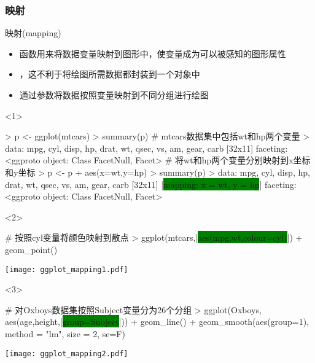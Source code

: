 \subsubsection{映射}
\begin{frame}[t,fragile]{\subsecname}{映射(mapping)}
\begin{itemize}
\item<1-> 函数用来将数据变量映射到图形中，使变量成为可以被感知的图形属性
\item<1-> ，这不利于将绘图所需数据都封装到一个对象中
\item<3-> 通过参数将数据按照变量映射到不同分组进行绘图
\end{itemize}

\begin{overlayarea}{\textwidth}{\textheight}
\begin{onlyenv}<1>
\begin{rcode}
> p <- ggplot(mtcars)
> summary(p)
# mtcars数据集中包括wt和hp两个变量
> data: mpg, cyl, disp, hp, drat, wt, qsec, vs, am, gear, carb [32x11]
  faceting: <ggproto object: Class FacetNull, Facet>
# 将wt和hp两个变量分别映射到x坐标和y坐标
> p <- p + aes(x=wt,y=hp)
> summary(p)
> data: mpg, cyl, disp, hp, drat, wt, qsec, vs, am, gear, carb [32x11]
  |\colorbox{green}{mapping:  x = wt, y = hp}|
  faceting: <ggproto object: Class FacetNull, Facet>
\end{rcode}
\end{onlyenv}

\begin{onlyenv}<2>
\begin{minipage}{\textwidth}
\begin{rcode}
# 按照cyl变量将颜色映射到散点 
> ggplot(mtcars,|\colorbox{green}{aes(mpg,wt,colour=cyl)}|) + geom_point()
\end{rcode}
\end{minipage}

\begin{minipage}{\textwidth}
\centering
\texttt{[image: ggplot\_mapping1.pdf]}
\end{minipage}
\end{onlyenv}

\begin{onlyenv}<3>
\begin{minipage}{\textwidth}
\begin{rcode}
# 对Oxboys数据集按照Subject变量分为26个分组
> ggplot(Oxboys, aes(age,height,|\colorbox{green}{group=Subject}|)) + geom_line() +
     geom_smooth(aes(group=1), method = "lm", size = 2, se=F)
\end{rcode}
\end{minipage}

\begin{minipage}{\textwidth}
\centering
\texttt{[image: ggplot\_mapping2.pdf]}
\end{minipage}
\end{onlyenv}
\end{overlayarea}
\end{frame}

